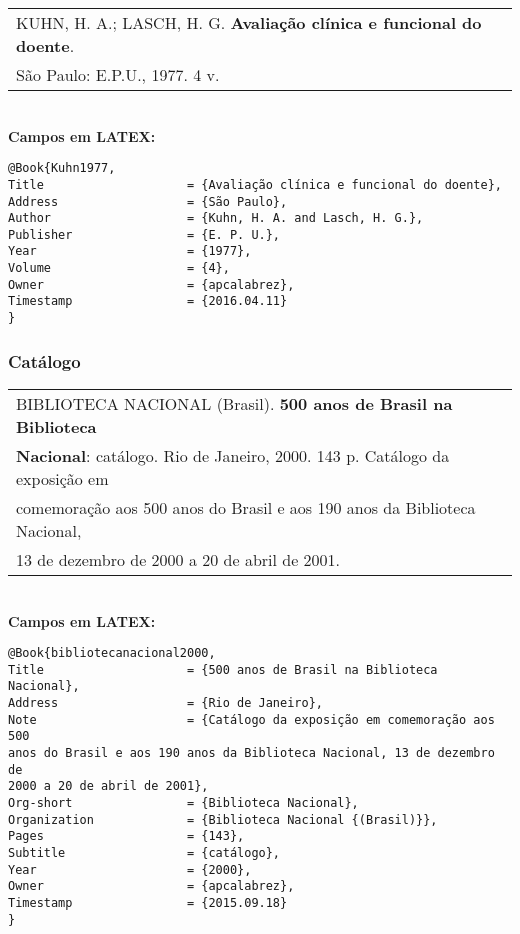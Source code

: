\begin{tabular}{|l|c|} \hline
KUHN, H. A.; LASCH, H. G. \textbf{Avaliação clínica e funcional do doente}. \\São Paulo:  E.P.U., 1977. 4 v.    \\\hline
\end{tabular}\\

\textbf{Campos em LATEX:}

\begin{verbatim}
@Book{Kuhn1977,
Title                    = {Avaliação clínica e funcional do doente},
Address                  = {São Paulo},
Author                   = {Kuhn, H. A. and Lasch, H. G.},
Publisher                = {E. P. U.},
Year                     = {1977},
Volume                   = {4},
Owner                    = {apcalabrez},
Timestamp                = {2016.04.11}
}
\end{verbatim}
\subsubsection{Catálogo}

\begin{tabular}{|l|c|} \hline
BIBLIOTECA NACIONAL (Brasil). \textbf{500 anos de Brasil na Biblioteca }\\ \textbf{Nacional}: catálogo. Rio de Janeiro, 2000. 143 p. Catálogo da exposição em \\comemoração aos 500  anos do Brasil e aos 190 anos da Biblioteca Nacional, \\13 de dezembro de 2000 a 20 de abril de 2001.    \\\hline
\end{tabular}\\

\textbf{Campos em LATEX:}

\begin{verbatim}
@Book{bibliotecanacional2000,
Title                    = {500 anos de Brasil na Biblioteca Nacional},
Address                  = {Rio de Janeiro},
Note                     = {Catálogo da exposição em comemoração aos 500
anos do Brasil e aos 190 anos da Biblioteca Nacional, 13 de dezembro de
2000 a 20 de abril de 2001},
Org-short                = {Biblioteca Nacional},
Organization             = {Biblioteca Nacional {(Brasil)}},
Pages                    = {143},
Subtitle                 = {catálogo},
Year                     = {2000},
Owner                    = {apcalabrez},
Timestamp                = {2015.09.18}
}
\end{verbatim}


